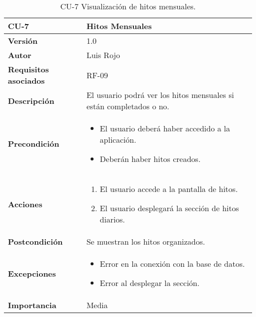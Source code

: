 \begin{table}[p]
	\centering
	\begin{tabularx}{\linewidth}{ p{} p{} }
		\toprule
		\textbf{CU-7}    & \textbf{Hitos Mensuales}\\
		\toprule
		\textbf{Versión}              & 1.0    \\
		\textbf{Autor}                & Luis Rojo \\
		\textbf{Requisitos asociados} & RF-09 \\
		\textbf{Descripción}          & El usuario podrá ver los hitos mensuales si están completados o no. \\
		\textbf{Precondición}         &
            \begin{itemize}
                \item El usuario deberá haber accedido a la aplicación.
                \item Deberán haber hitos creados.
            \end{itemize}
            \\
		\textbf{Acciones}             &
		\begin{enumerate}
			\def\labelenumi{\arabic{enumi}.}
			\tightlist
			\item El usuario accede a la pantalla de hitos.
			\item El usuario desplegará la sección de hitos diarios.
		\end{enumerate}\\
		\textbf{Postcondición}        & Se muestran los hitos organizados. \\
		\textbf{Excepciones}          &  
            \begin{itemize}
                \item Error en la conexión con la base de datos.
                \item Error al desplegar la sección.
            \end{itemize}
           \\
		\textbf{Importancia}          & Media  \\
		\bottomrule
	\end{tabularx}
	\caption{CU-7 Visualización de hitos mensuales.}
\end{table}



